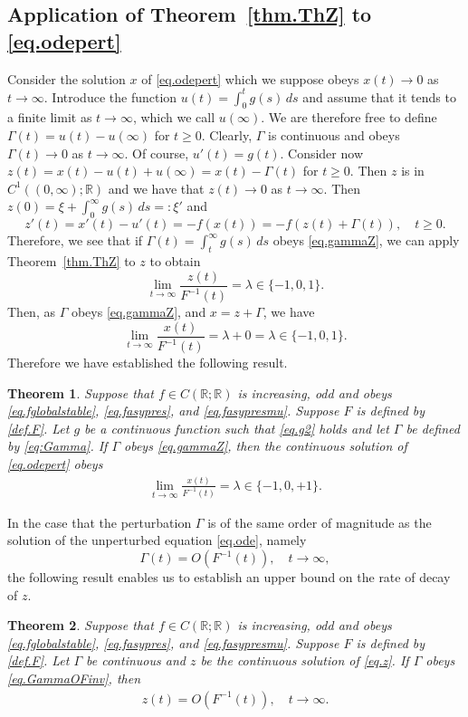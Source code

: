 \documentclass[a4paper,10pt,reqno]{amsart}
\numberwithin{equation}{section}
\newtheorem{theorem}{Theorem}
\theoremstyle{definition}
\theoremstyle{remark}
\DeclareMathOperator{\1}{\mathbbm 1}
\begin{document}
	\subsection{Application of Theorem~\ref{thm.ThZ} to \eqref{eq.odepert}} \label{applyThm1}
	Consider the solution $x$ of \eqref{eq.odepert} which we suppose obeys $x(t)\to 0$ as $t\to\infty$. Introduce the function $u(t)=\int_0^t g(s)\,ds$ and assume that it tends to a finite limit as $t\to\infty$, which we call $u(\infty)$. We are therefore free to define $\Gamma(t)=u(t)-u(\infty)$ for $t\geq 0$. Clearly, $\Gamma$ is continuous and obeys $\Gamma(t)\to 0$ as $t\to\infty$. Of course, $u'(t)=g(t)$. Consider now $z(t)=x(t)-u(t)+u(\infty)=x(t)-\Gamma(t)$ for $t\geq 0$. Then $z$ is in $C^1((0,\infty);\mathbb{R})$ and we have that $z(t)\to 0$ as $t\to\infty$. Then $z(0)=\xi+\int_0^\infty g(s)\,ds=:\xi'$ and 
	\[
	z'(t)=x'(t)-u'(t)=-f(x(t))=-f(z(t)+\Gamma(t)), \quad t\geq 0.
	\]
	Therefore, we see that if $\Gamma(t)=\int_t^\infty g(s)\,ds$ obeys \eqref{eq.gammaZ}, we can apply Theorem~\ref{thm.ThZ} to $z$ to obtain 
	\[
	\lim_{t\to\infty} \frac{z(t)}{F^{-1}(t)}=\lambda\in \{-1,0,1\}. 
	\] 
	Then, as $\Gamma$ obeys \eqref{eq.gammaZ}, and $x=z+\Gamma$, we have
	\[
	\lim_{t\to\infty} \frac{x(t)}{F^{-1}(t)}
	=\lambda+0=\lambda\in \{-1,0,1\}. 
	\]  
	Therefore we have established the following result.
	\begin{theorem}\label{thm.T1ch3}
		Suppose that $f\in C(\mathbb{R};\mathbb{R})$ is increasing, odd and obeys \eqref{eq.fglobalstable}, \eqref{eq.fasypres}, and \eqref{eq.fasypresmu}. Suppose $F$ is defined by \eqref{def.F}.  Let $g$ be a continuous function such that \eqref{eq.g2} holds and let $\Gamma$ be defined by \eqref{eq:Gamma}. 
		If $\Gamma$ obeys \eqref{eq.gammaZ}, then the continuous solution of \eqref{eq.odepert}  obeys 
		\begin{align*}
			\lim_{t \to \infty} \frac{x(t)}{F^{-1}(t)} =\lambda\in \{-1,0,+1\}.
		\end{align*}
	\end{theorem}
	In the case that the perturbation $\Gamma$ is of the same order of magnitude as the solution of the unperturbed equation \eqref{eq.ode}, namely
	\begin{equation} \label{eq.GammaOFinv}
		\Gamma(t)=O(F^{-1}(t)), \quad t\to\infty,
	\end{equation}
	the following result enables us to establish an upper bound on the rate of decay of $z$. 
	\begin{theorem} \label{ThZbdd}
		Suppose that $f\in C(\mathbb{R};\mathbb{R})$ is increasing, odd and obeys \eqref{eq.fglobalstable}, \eqref{eq.fasypres}, and \eqref{eq.fasypresmu}. Suppose $F$ is defined by \eqref{def.F}.   Let $\Gamma$ be continuous and $z$ be the continuous solution of \eqref{eq.z}. 
		If $\Gamma$ obeys \eqref{eq.GammaOFinv}, then  
		\begin{align*}
			z(t)=O(F^{-1}(t)), \quad t\to\infty.
		\end{align*}
	\end{theorem}
\end{document}
